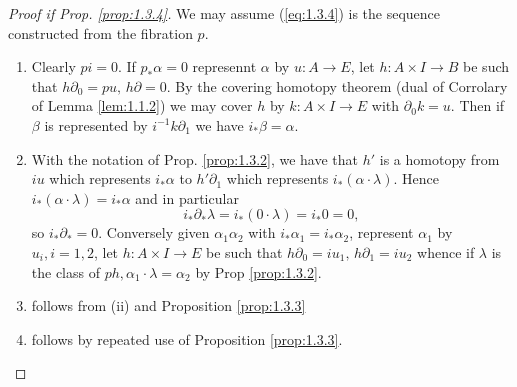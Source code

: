 \documentclass[../main]{subfiles}
\begin{document}
\begin{proof}[Proof if Prop. \ref{prop:1.3.4}]
    We may assume (\ref{eq:1.3.4}) is the sequence constructed from the fibration $p$.
    \begin{enumerate}[label=(\roman*)]
        \item Clearly $pi=0$.  If $p_*\alpha = 0$ represennt $\alpha$ by $u:A \longrightarrow E$, let $h:A \times I \longrightarrow B$ be such that $h\partial_0 = pu, \,h\partial = 0$.  By the covering homotopy theorem (dual of Corrolary of Lemma \ref{lem:1.1.2}) we may cover $h$ by $k:A \times I \longrightarrow E$ with $\partial_0 k=u$.  Then if $\beta$ is represented by $i^{-1}k\partial_1$ we have $i_*\beta = \alpha$.
        \item With the notation of Prop. \ref{prop:1.3.2}, we have that $h'$ is a homotopy from $iu$ which represents $i_*\alpha$ to $h'\partial_1$ which represents $i_*(\alpha \cdot \lambda)$.  Hence $i_*(\alpha \cdot \lambda) = i_* \alpha$ and in particular \[i_*\partial_*\lambda = i_*(0\cdot \lambda) = i_*0 = 0,\] so $i_*\partial_* = 0$.  Conversely given $\alpha_1 \alpha_2$ with $i_*\alpha_1 = i_*\alpha_2$, represent $\alpha_1$ by $u_i, i = 1,2$, let $h:A \times I \longrightarrow E$ be such that $h\partial_0 = iu_1 , \,h\partial_1 = iu_2$ whence if $\lambda$ is the class of $ph, \alpha_1 \cdot \lambda = \alpha_2$ by Prop \ref{prop:1.3.2}.
        \item follows from (ii) and Proposition \ref{prop:1.3.3}
        \item follows by repeated use of Proposition \ref{prop:1.3.3}.
    \end{enumerate}
\end{proof}
\end{document}
